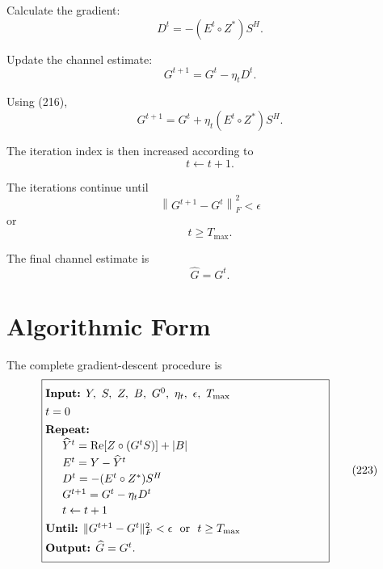 \documentclass[12pt,a4paper]{article}
\begin{document}
Calculate the gradient:
\begin{equation}
\boxed{
D^{t}
=
-(E^{t}\circ Z^*)S^H
}.
\tag{216}
\end{equation}

Update the channel estimate:
\begin{equation}
\boxed{
G^{t+1}
=
G^{t}
-
\eta_t D^{t}
}.
\tag{217}
\end{equation}

Using (216),
\begin{equation}
\boxed{
G^{t+1}
=
G^{t}
+
\eta_t(E^{t}\circ Z^*)S^H
}.
\tag{218}
\end{equation}

The iteration index is then increased according to
\begin{equation}
t\leftarrow t+1.
\tag{219}
\end{equation}

The iterations continue until
\begin{equation}
\boxed{
\left\|
G^{t+1}-G^{t}
\right\|_F^2
<
\epsilon
}
\tag{220}
\end{equation}
or
\begin{equation}
t\geq T_{\max}.
\tag{221}
\end{equation}

The final channel estimate is
\begin{equation}
\boxed{
\widehat G
=
G^{t}
}.
\tag{222}
\end{equation}

\section{Algorithmic Form}

The complete gradient-descent procedure is
\begin{equation}
\fbox{%
\begin{minipage}{0.72\linewidth}
\vspace{4pt}
\textbf{Input:} $Y,\ S,\ Z,\ B,\ G^{0},\ \eta_t,\ \epsilon,\ T_{\max}$\\[4pt]
$t=0$\\[4pt]
\textbf{Repeat:}\\[2pt]
\hspace*{1.5em}$\widehat Y^{t}=\operatorname{Re}[Z\circ(G^{t}S)]+|B|$\\[2pt]
\hspace*{1.5em}$E^{t}=Y-\widehat Y^{t}$\\[2pt]
\hspace*{1.5em}$D^{t}=-(E^{t}\circ Z^*)S^H$\\[2pt]
\hspace*{1.5em}$G^{t+1}=G^{t}-\eta_t D^{t}$\\[2pt]
\hspace*{1.5em}$t\leftarrow t+1$\\[4pt]
\textbf{Until:} $\|G^{t+1}-G^{t}\|_F^2<\epsilon$ \ or \ $t\geq T_{\max}$\\[4pt]
\textbf{Output:} $\widehat G=G^{t}$.
\vspace{4pt}
\end{minipage}}
\tag{223}
\end{equation}
\end{document}

